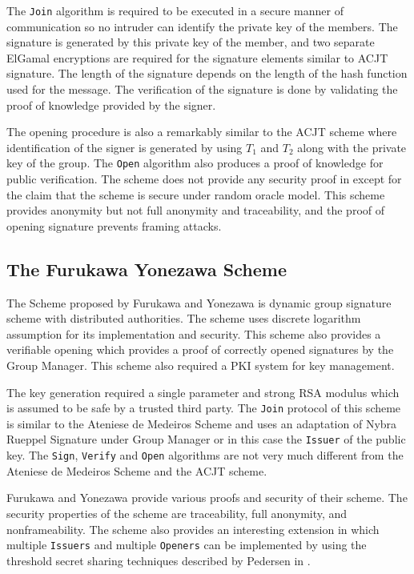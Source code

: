 The \texttt{Join} algorithm is required to be executed in a secure manner of communication so no intruder can identify the private key of the members. The signature is generated by this private key of the member, and two separate ElGamal encryptions are required for the signature elements similar to ACJT signature. The length of the signature depends on the length of the hash function used for the message. The verification of the signature is done by validating the proof of knowledge provided by the signer. 

The opening procedure is also a remarkably similar to the ACJT scheme where identification of the signer is generated by using $T_1$ and $T_2$ along with the private key of the group. The \texttt{Open} algorithm also produces a proof of knowledge for public verification. The scheme does not provide any security proof in \cite{ateniese2003efficient} except for the claim that the scheme is secure under random oracle model. This scheme provides anonymity but not full anonymity and traceability, and the proof of opening signature prevents framing attacks.

\subsection{The Furukawa Yonezawa Scheme}\label{FY}
The Scheme proposed by Furukawa and Yonezawa is dynamic group signature scheme with distributed authorities\cite{furukawa2004group}. The scheme uses discrete logarithm assumption for its implementation and security. This scheme also provides a verifiable opening which provides a proof of correctly opened signatures by the Group Manager. This scheme also required a PKI system for key management. 

The key generation required a single parameter and strong RSA modulus which is assumed to be safe by a trusted third party. The \texttt{Join} protocol of this scheme is similar to the Ateniese de Medeiros Scheme and uses an adaptation of Nybra Rueppel Signature under Group Manager or in this case the \texttt{Issuer} of the public key. The \texttt{Sign}, \texttt{Verify} and \texttt{Open} algorithms are not very much different from the Ateniese de Medeiros Scheme and the ACJT scheme. 

Furukawa and Yonezawa provide various proofs and security of their scheme. The security properties of the scheme are traceability, full anonymity, and nonframeability. The scheme also provides an interesting extension in which multiple \texttt{Issuers} and multiple \texttt{Openers} can be implemented by using the threshold secret sharing techniques described by Pedersen in \cite{pedersen1991threshold}. 

